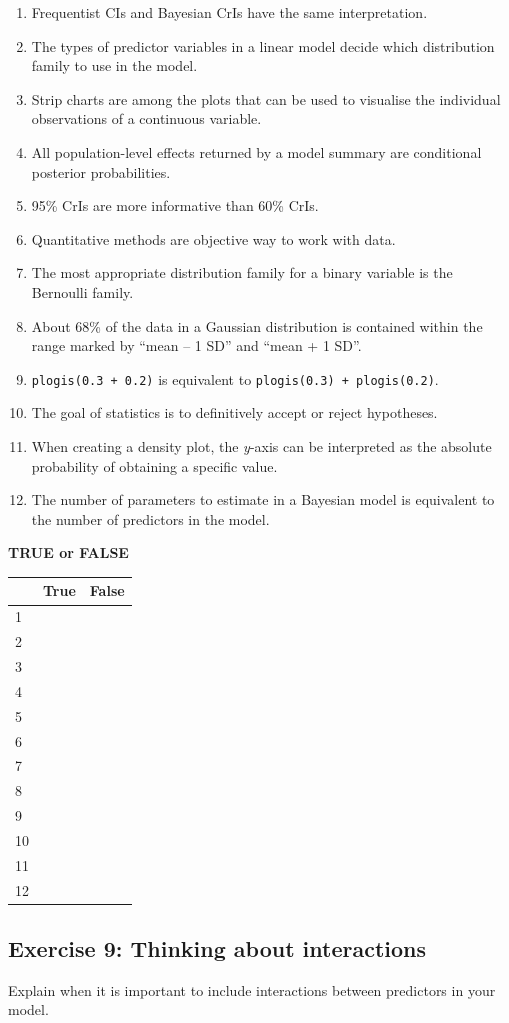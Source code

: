 \documentclass[
]{article}
\providecommand{\tightlist}{%
  \setlength{\itemsep}{0pt}\setlength{\parskip}{0pt}}
\begin{document}
\begin{enumerate}
\def\labelenumi{\arabic{enumi}.}
\tightlist
\item
  Frequentist CIs and Bayesian CrIs have the same interpretation.
\item
  The types of predictor variables in a linear model decide which
  distribution family to use in the model.
\item
  Strip charts are among the plots that can be used to visualise the
  individual observations of a continuous variable.
\item
  All population-level effects returned by a model summary are
  conditional posterior probabilities.
\item
  95\% CrIs are more informative than 60\% CrIs.
\item
  Quantitative methods are objective way to work with data.
\item
  The most appropriate distribution family for a binary variable is the
  Bernoulli family.
\item
  About 68\% of the data in a Gaussian distribution is contained within
  the range marked by ``mean -- 1 SD'' and ``mean + 1 SD''.
\item
  \texttt{plogis(0.3\ +\ 0.2)} is equivalent to
  \texttt{plogis(0.3)\ +\ plogis(0.2)}.
\item
  The goal of statistics is to definitively accept or reject hypotheses.
\item
  When creating a density plot, the \emph{y}-axis can be interpreted as
  the absolute probability of obtaining a specific value.
\item
  The number of parameters to estimate in a Bayesian model is equivalent
  to the number of predictors in the model.
\end{enumerate}

\textbf{TRUE or FALSE}

\begin{longtable}[]{@{}lll@{}}
\toprule()
& True & False \\
\midrule()
\endhead
1 & & \\
2 & & \\
3 & & \\
4 & & \\
5 & & \\
6 & & \\
7 & & \\
8 & & \\
9 & & \\
10 & & \\
11 & & \\
12 & & \\
\bottomrule()
\end{longtable}

\hypertarget{exercise-9-thinking-about-interactions}{%
\subsection{Exercise 9: Thinking about
interactions}\label{exercise-9-thinking-about-interactions}}

Explain when it is important to include interactions between predictors
in your model.
\end{document}
